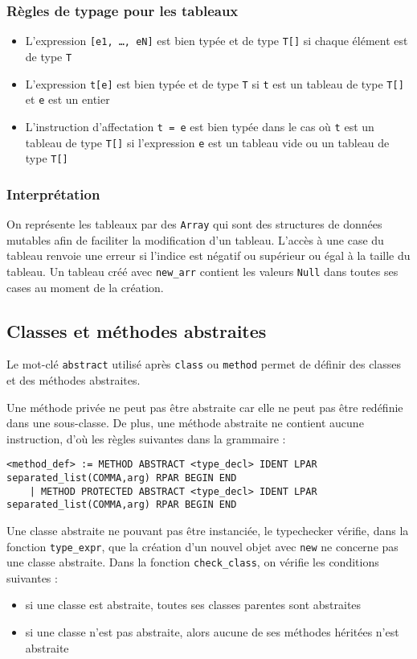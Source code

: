 \documentclass{article}
\begin{document}
\subsubsection{Règles de typage pour les tableaux} 
\begin{itemize}
    \item L'expression \texttt{[e1, \dots, eN]} est bien typée et de type \texttt{T[]} si chaque élément est de type \texttt{T}
    \item L'expression \texttt{t[e]} est bien typée et de type \texttt{T} si \texttt{t} est un tableau de type \texttt{T[]} et \texttt{e} est un entier
    \item L'instruction d'affectation \texttt{t = e} est bien typée dans le cas où \texttt{t} est un tableau de type \texttt{T[]} si l'expression \texttt{e} est un tableau vide ou un tableau de type \texttt{T[]}
\end{itemize}

\subsubsection{Interprétation}
On représente les tableaux par des \texttt{Array} qui sont des structures de données mutables afin de faciliter la modification d'un tableau.
L'accès à une case du tableau renvoie une erreur si l'indice est négatif ou supérieur ou égal à la taille du tableau.
Un tableau créé avec \texttt{new\_arr} contient les valeurs \texttt{Null} dans toutes ses cases au moment de la création.

\subsection{Classes et méthodes abstraites}
Le mot-clé \texttt{abstract} utilisé après \texttt{class} ou \texttt{method} permet de définir des classes et des méthodes abstraites.

Une méthode privée ne peut pas être abstraite car elle ne peut pas être redéfinie dans une sous-classe. De plus, une méthode abstraite ne contient aucune instruction, d'où les règles suivantes dans la grammaire : 
\begin{lstlisting}[style=mystyle]
<method_def> := METHOD ABSTRACT <type_decl> IDENT LPAR separated_list(COMMA,arg) RPAR BEGIN END
    | METHOD PROTECTED ABSTRACT <type_decl> IDENT LPAR separated_list(COMMA,arg) RPAR BEGIN END
\end{lstlisting}
Une classe abstraite ne pouvant pas être instanciée, le typechecker vérifie, dans la fonction \texttt{type\_expr}, que la création d'un nouvel objet avec \texttt{new} ne concerne pas une classe abstraite. Dans la fonction \texttt{check\_class}, on vérifie les conditions suivantes : 
\begin{itemize}
    \item si une classe est abstraite, toutes ses classes parentes sont abstraites
    \item si une classe n'est pas abstraite, alors aucune de ses méthodes héritées n'est abstraite
\end{itemize}
\end{document}
